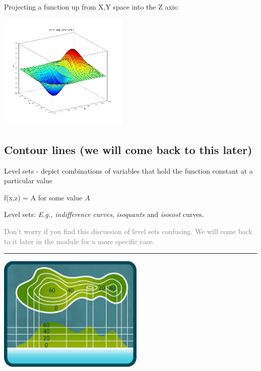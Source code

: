 \documentclass[]{article}
\providecommand{\tightlist}{%
  \setlength{\itemsep}{0pt}\setlength{\parskip}{0pt}}
\begin{document}
Projecting a function up from X,Y space into the Z axis:

\includegraphics[height=2.2in]{picsfigs/doubledip.jpg}

\hypertarget{contourlines_math}{%
\subsection{Contour lines (we will come back to this
later)}\label{contourlines_math}}

\begin{description}
\tightlist
\item[Contour lines]
Level sets - depict combinations of variables that hold the function
constant at a particular value

f(x,z) = A for some value \(A\)
\end{description}

Level sets: \emph{E.g., indifference curves}, \emph{isoquants} and
\emph{isocost} curves.

\textcolor{gray}{Don't worry if you find this discussion of level sets confusing. We will come back to it later in the module for a more specific case.}

\begin{center}\rule{0.5\linewidth}{\linethickness}\end{center}

\includegraphics[height=2.2in]{picsfigs/contourlines.jpeg}
\end{document}
